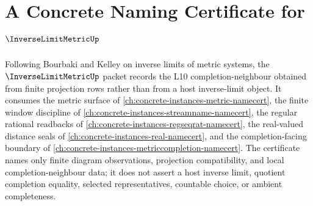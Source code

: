 \chapter{A Concrete Naming Certificate for $\InverseLimitMetricUp$}
\label{ch:concrete-instances-inverse-limit-metric-namecert}

Following Bourbaki and Kelley on inverse limits of metric systems, the $\InverseLimitMetricUp$ packet records the L10 completion-neighbour obtained from finite projection rows rather than from a host inverse-limit object. It consumes the metric surface of \autoref{ch:concrete-instances-metric-namecert}, the finite window discipline of \autoref{ch:concrete-instances-streamname-namecert}, the regular rational readbacks of \autoref{ch:concrete-instances-regseqrat-namecert}, the real-valued distance seals of \autoref{ch:concrete-instances-real-namecert}, and the completion-facing boundary of \autoref{ch:concrete-instances-metriccompletion-namecert}. The certificate names only finite diagram observations, projection compatibility, and local completion-neighbour data; it does not assert a host inverse limit, quotient completion equality, selected representatives, countable choice, or ambient completeness.

